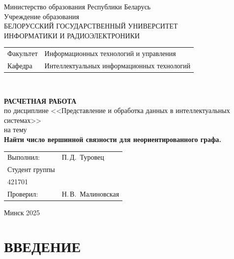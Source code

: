 \documentclass[a4paper,12pt]{article}
\begin{document}
\thispagestyle{empty}
\begin{titlepage}
  \begin{center}
    Министерство образования Республики Беларусь\\[1em]
    Учреждение образования\\
    БЕЛОРУССКИЙ ГОСУДАРСТВЕННЫЙ УНИВЕРСИТЕТ \\
    ИНФОРМАТИКИ И РАДИОЭЛЕКТРОНИКИ\\[1em]

    \begin{minipage}{\textwidth}
      \begin{flushleft}
        \begin{tabular}{ l l }
          Факультет & Информационных технологий и управления\\
          Кафедра   & Интеллектуальных информационных технологий
        \end{tabular}
      \end{flushleft}
    \end{minipage}\\[1em]

    \vspace{5em}


    \textbf{РАСЧЕТНАЯ РАБОТА}\\
    {по дисциплине <<Представление и обработка данных в интеллектуальных системах>>}\\
    на тему\\
    \textbf{\large Найти число вершинной связности для неориентированного графа.}\\[1em]

    \vspace{10em}
    
    \begin{tabular}{ p{}p{} }
      Выполнил:& П.\,Д.~Туровец \\[1em]
      Студент группы& \\
      421701 & \\
      Проверил: & Н.\,В.~Малиновская \\
     
    \end{tabular}
    
    \vfill
    {\normalsize Минск 2025}
  \end{center}
\end{titlepage}
\section{ВВЕДЕНИЕ}
\end{document}
